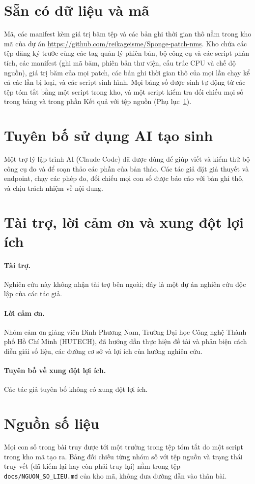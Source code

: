 \documentclass[12pt,a4paper]{article}
\begin{document}
\section*{Sẵn có dữ liệu và mã}
Mã, các manifest kèm giá trị băm tệp và các bản ghi thời gian thô nằm trong kho mã của dự án \url{https://github.com/reikageisme/Sponge-patch-nms}. Kho chứa các tệp đăng ký trước cùng các tag quản lý phiên bản, bộ công cụ và các script phân tích, các manifest (ghi mã băm, phiên bản thư viện, cấu trúc CPU và chế độ nguồn), giá trị băm của mọi patch, các bản ghi thời gian thô của mọi lần chạy kể cả các lần bị loại, và các script sinh hình. Mọi bảng số được sinh tự động từ các tệp tóm tắt bằng một script trong kho, và một script kiểm tra đối chiếu mọi số trong bảng và trong phần Kết quả với tệp nguồn (Phụ lục~\ref{app:src}).

\section*{Tuyên bố sử dụng AI tạo sinh}
Một trợ lý lập trình AI (Claude Code) đã được dùng để giúp viết và kiểm thử bộ công cụ đo và để soạn thảo các phần của bản thảo. Các tác giả đặt giả thuyết và endpoint, chạy các phép đo, đối chiếu mọi con số được báo cáo với bản ghi thô, và chịu trách nhiệm về nội dung.

\section*{Tài trợ, lời cảm ơn và xung đột lợi ích}
\paragraph{Tài trợ.} Nghiên cứu này không nhận tài trợ bên ngoài; đây là một dự án nghiên cứu độc lập của các tác giả.
\paragraph{Lời cảm ơn.} Nhóm cảm ơn giảng viên Đinh Phương Nam, Trường Đại học Công nghệ Thành phố Hồ Chí Minh (HUTECH), đã hướng dẫn thực hiện đề tài và phản biện cách diễn giải số liệu, các đường cơ sở và lợi ích của hướng nghiên cứu.
\paragraph{Tuyên bố về xung đột lợi ích.} Các tác giả tuyên bố không có xung đột lợi ích.

\appendix
\section{Nguồn số liệu}
\label{app:src}
Mọi con số trong bài truy được tới một trường trong tệp tóm tắt do một script trong kho mã tạo ra. Bảng đối chiếu từng nhóm số với tệp nguồn và trạng thái truy vết (đã kiểm lại hay còn phải truy lại) nằm trong tệp \texttt{docs/NGUON\_SO\_LIEU.md} của kho mã, không đưa đường dẫn vào thân bài.



\end{document}
